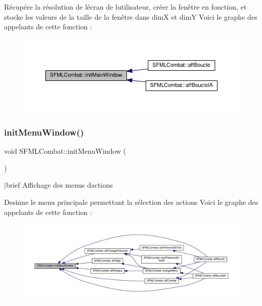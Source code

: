Récupére la résolution de l\textquotesingle{}écran de l\textquotesingle{}utilisateur, créer la fenêtre en fonction, et stocke les valeurs de la taille de la fenêtre dans dimX et dimY Voici le graphe des appelants de cette fonction \+:\nopagebreak
\begin{figure}[H]
\begin{center}
\leavevmode
\includegraphics[width=350pt]{class_s_f_m_l_combat_a9d307eb8a3289a694486f30b56ca402d_icgraph}
\end{center}
\end{figure}
\mbox{\label{class_s_f_m_l_combat_aba0eacdc425cc859b8533060ead79564}} 
\subsubsection{\texorpdfstring{init\+Menu\+Window()}{initMenuWindow()}}
{\footnotesize\ttfamily void S\+F\+M\+L\+Combat\+::init\+Menu\+Window (\begin{DoxyParamCaption}{ }\end{DoxyParamCaption})\hspace{0.3cm}{\ttfamily [private]}}

$\vert$brief Affichage des menus d\textquotesingle{}actions

Desinne le menu principale permettant la sélection des actions Voici le graphe des appelants de cette fonction \+:\nopagebreak
\begin{figure}[H]
\begin{center}
\leavevmode
\includegraphics[width=350pt]{class_s_f_m_l_combat_aba0eacdc425cc859b8533060ead79564_icgraph}
\end{center}
\end{figure}
\mbox{\label{class_s_f_m_l_combat_a2665ce99eeccb4bdb1e032086a9feb04}} 
